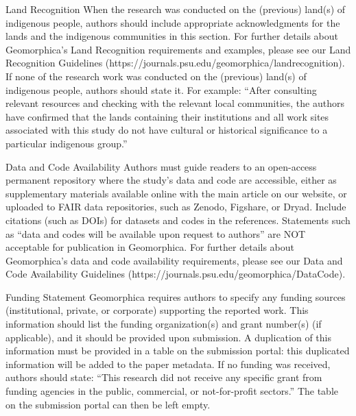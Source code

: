 \documentclass[titlepage]{geomorphica}
\begin{document}
\begin{closing}{Land Recognition}
	When the research was conducted on the (previous) land(s) of indigenous people, authors should include appropriate acknowledgments for the lands and the indigenous communities in this section. For further details about Geomorphica’s Land Recognition requirements and examples, please see our Land Recognition Guidelines (https://journals.psu.edu/geomorphica/landrecognition).
If none of the research work was conducted on the (previous) land(s) of indigenous people, authors should state it. For example:
“After consulting relevant resources and checking with the relevant local communities, the authors have confirmed that the lands containing their institutions and all work sites associated with this study do not have cultural or historical significance to a particular indigenous group.”
\end{closing}
\begin{closing}{Data and Code Availability}
	Authors must guide readers to an open-access permanent repository where the study's data and code are accessible, either as supplementary materials available online with the main article on our website, or uploaded to FAIR data repositories, such as Zenodo, Figshare, or Dryad. Include citations (such as DOIs) for datasets and codes in the references. Statements such as “data and codes will be available upon request to authors” are NOT acceptable for publication in Geomorphica.
For further details about Geomorphica’s data and code availability requirements, please see our Data and Code Availability Guidelines (https://journals.psu.edu/geomorphica/DataCode).
\end{closing}
\begin{closing}{Funding Statement}
	Geomorphica requires authors to specify any funding sources (institutional, private, or corporate) supporting the reported work. This information should list the funding organization(s) and grant number(s) (if applicable), and it should be provided upon submission. A duplication of this information must be provided in a table on the submission portal: this duplicated information will be added to the paper metadata.  If no funding was received, authors should state: “This research did not receive any specific grant from funding agencies in the public, commercial, or not-for-profit sectors.” The table on the submission portal can then be left empty.
\end{closing}
\end{document}
